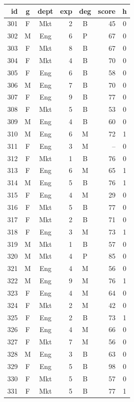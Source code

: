 \documentclass[11pt,a4paper]{article}
\renewcommand{\arraystretch}{1.15}
\begin{document}
\begin{center}\scriptsize\setlength{\tabcolsep}{3.5pt}\renewcommand{\arraystretch}{1.0}
\begin{tabular}[t]{@{}r c c r c r c@{}}
\toprule
id & g & dept & exp & deg & score & h \\
\midrule
301 & F & Mkt & 2 & B & 45 & 0 \\
302 & M & Eng & 6 & P & 67 & 0 \\
303 & F & Mkt & 8 & B & 67 & 0 \\
304 & F & Mkt & 4 & B & 70 & 0 \\
305 & F & Eng & 6 & B & 58 & 0 \\
306 & M & Eng & 7 & B & 70 & 0 \\
307 & F & Eng & 9 & B & 77 & 0 \\
308 & F & Mkt & 5 & B & 53 & 0 \\
309 & M & Eng & 4 & B & 60 & 0 \\
310 & M & Eng & 6 & M & 72 & 1 \\
311 & F & Eng & 3 & M & -- & 0 \\
312 & F & Mkt & 1 & B & 76 & 0 \\
313 & F & Eng & 6 & M & 65 & 1 \\
314 & M & Eng & 5 & B & 76 & 1 \\
315 & F & Eng & 4 & M & 29 & 0 \\
316 & F & Mkt & 5 & B & 77 & 0 \\
317 & F & Mkt & 2 & B & 71 & 0 \\
318 & F & Eng & 3 & M & 73 & 1 \\
319 & M & Mkt & 1 & B & 57 & 0 \\
320 & M & Mkt & 4 & P & 85 & 0 \\
321 & M & Eng & 4 & M & 56 & 0 \\
322 & M & Eng & 9 & M & 76 & 1 \\
323 & F & Eng & 4 & M & 64 & 0 \\
324 & F & Mkt & 2 & M & 42 & 0 \\
325 & F & Eng & 2 & B & 73 & 1 \\
326 & F & Eng & 4 & M & 66 & 0 \\
327 & F & Mkt & 7 & M & 56 & 0 \\
328 & M & Eng & 3 & B & 63 & 0 \\
329 & F & Eng & 5 & B & 98 & 0 \\
330 & F & Mkt & 5 & B & 57 & 0 \\
331 & F & Mkt & 5 & B & 77 & 1 \\

\end{tabular}
\end{center}
\end{document}
